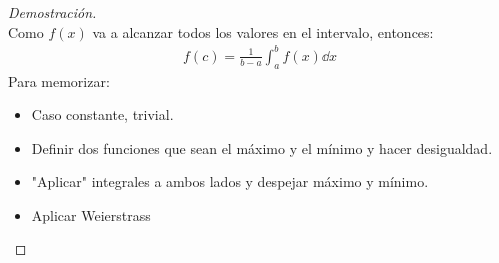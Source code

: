 \documentclass{article}
\begin{document}
\begin{proof}[Demostración]
\begin{equation}
    \end{equation}
Como \(f(x)\) va a alcanzar todos los valores en el intervalo, entonces:
    \begin{equation}
        \begin{split}
            f(c)= \frac{1}{b-a} \int _{a}^b f(x) \dd{x}
        \end{split}
    \end{equation}
Para memorizar:
\begin{itemize}
	\item Caso constante, trivial.
	\item Definir dos funciones que sean el máximo y el mínimo y hacer desigualdad.
	\item "Aplicar" integrales a ambos lados y despejar máximo y mínimo.
	\item Aplicar Weierstrass
\end{itemize}
\end{proof}
\end{document}

